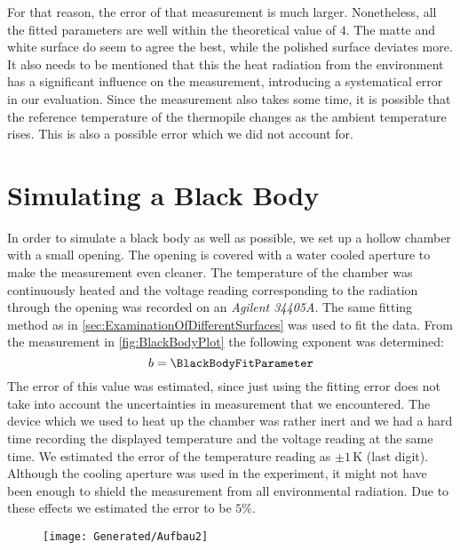 \documentclass[a4paper,10pt,twocolumn]{article}
\begin{document}
    For that reason, the error of that measurement is much larger.
    Nonetheless, all the fitted parameters are well within the theoretical value of $4$.
    The matte and white surface do seem to agree the best, while the polished surface deviates more.
    It also needs to be mentioned that this the heat radiation from the environment has a significant influence on the measurement, introducing a systematical error in our evaluation.
    Since the measurement also takes some time, it is possible that the reference temperature of the thermopile changes as the ambient temperature rises.
    This is also a possible error which we did not account for.
    
    
    
    
    \section{Simulating a Black Body}\label{BlackBodyRadiation}
    In order to simulate a black body as well as possible, we set up a hollow chamber with a small opening.
    The opening is covered with a water cooled aperture to make the measurement even cleaner.
    The temperature of the chamber was continuously heated and the voltage reading corresponding to the radiation through the opening was recorded on an \textit{Agilent 34405A}.
    The same fitting method as in \autoref{sec:ExaminationOfDifferentSurfaces} was used to fit the data.
    From the measurement in \autoref{fig:BlackBodyPlot} the following exponent was determined:
    \begin{equation}
        b = \BlackBodyFitParameter
    \end{equation}
    The error of this value was estimated, since just using the fitting error does not take into account the uncertainties in measurement that we encountered.
    The device which we used to heat up the chamber was rather inert and we had a hard time recording the displayed temperature and the voltage reading at the same time.
    We estimated the error of the temperature reading as $\pm 1\,$K (last digit).
    Although the cooling aperture was used in the experiment, it might not have been enough to shield the measurement from all environmental radiation.
    Due to these effects we estimated the error to be $5\%$\).
    \begin{figure}
        \begin{center}
            \texttt{[image: Generated/Aufbau2]}
            \caption{}
            \label{fig:Aufbau2}
        \end{center}
    \end{figure}
\end{document}
